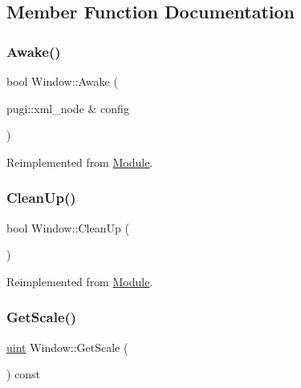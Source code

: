 \subsection{Member Function Documentation}
\mbox{\label{class_window_a0b02015257037d885d85afb77d0a3605}} 
\subsubsection{\texorpdfstring{Awake()}{Awake()}}
{\footnotesize\ttfamily bool Window\+::\+Awake (\begin{DoxyParamCaption}\item[{pugi\+::xml\+\_\+node \&}]{config }\end{DoxyParamCaption})\hspace{0.3cm}{\ttfamily [virtual]}}



Reimplemented from \mbox{\hyperlink{class_module_a4a283650cf8a73aa0b5599106bc2ba6c}{Module}}.

\mbox{\label{class_window_aed8304cc37c842ff56f5428524163fea}} 
\subsubsection{\texorpdfstring{CleanUp()}{CleanUp()}}
{\footnotesize\ttfamily bool Window\+::\+Clean\+Up (\begin{DoxyParamCaption}{ }\end{DoxyParamCaption})\hspace{0.3cm}{\ttfamily [virtual]}}



Reimplemented from \mbox{\hyperlink{class_module_a77d7a006e42c0bd10110e1adbd4598cb}{Module}}.

\mbox{\label{class_window_ad659334e5d8a448fafbb5a0262b2ac9a}} 
\subsubsection{\texorpdfstring{GetScale()}{GetScale()}}
{\footnotesize\ttfamily \mbox{\hyperlink{_defs_8h_a91ad9478d81a7aaf2593e8d9c3d06a14}{uint}} Window\+::\+Get\+Scale (\begin{DoxyParamCaption}{ }\end{DoxyParamCaption}) const}

